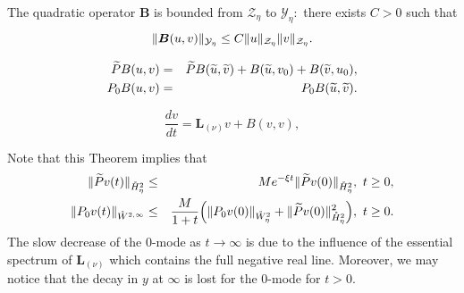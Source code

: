 \documentclass[10pt,a4paper]{amsart}
\begin{document}
\begin{lemma}
The quadratic operator $\boldsymbol{B}$ is bounded from $\mathcal{Z}_{\eta}$ to 
$\mathcal{Y}_{\eta}:$ there exists $C>0$ such that%
\begin{equation}
\|\boldsymbol{B}(u,v)\|_{\mathcal{Y}_{\eta}}\leq C\|u\|_{\mathcal{Z}_{\eta}}\|v\|_{%
\mathcal{Z}_{\eta}}.  \label{bound B}
\end{equation}
\end{lemma}

\begin{eqnarray}
\widetilde{P}B(u,v) &=&\widetilde{P}B(\widetilde{u},\widetilde{v})+B(%
\widetilde{u},v_{0})+B(\widetilde{v},u_{0}),  \notag \\
P_{0}B(u,v) &=&P_{0}B(\widetilde{u},\widetilde{v}).
\label{quadratic identity}
\end{eqnarray}%

\begin{equation}
\frac{dv}{dt}=\boldsymbol{L}_{(\nu )}v+B(v,v),  \label{equ diff basic}
\end{equation}%

\begin{remark}
Note that this Theorem implies that 
\begin{eqnarray*}
\|\widetilde{P}v(t)\|_{\mathring{H}_{\eta}^{2}} &\leq &Me^{-\xi t}\|%
\widetilde{P}v(0)\|_{\mathring{H}_{\eta}^{2}},\text{ }t\geq 0, \\
\|P_{0}v(t)\|_{\mathring{W}^{2,\infty }} &\leq &\frac{M}{1+t}%
\Bigl( \|P_{0}v(0)\|_{\mathring{W}_{\eta}^{2}}+\|\widetilde{P}v(0)\|_{\mathring{H}%
_{\eta}^{2}}^{2} \Bigr),\text{ }t\geq 0.
\end{eqnarray*}%
The slow decrease of the $0$-mode as $t\rightarrow \infty $ is due to the
influence of the essential spectrum of $\boldsymbol{L}_{(\nu )}$ which contains
the full negative real line. Moreover, we may notice that the decay in $y$
at $\infty $ is lost for the $0$-mode for $t>0.$
\end{remark}
\end{document}
